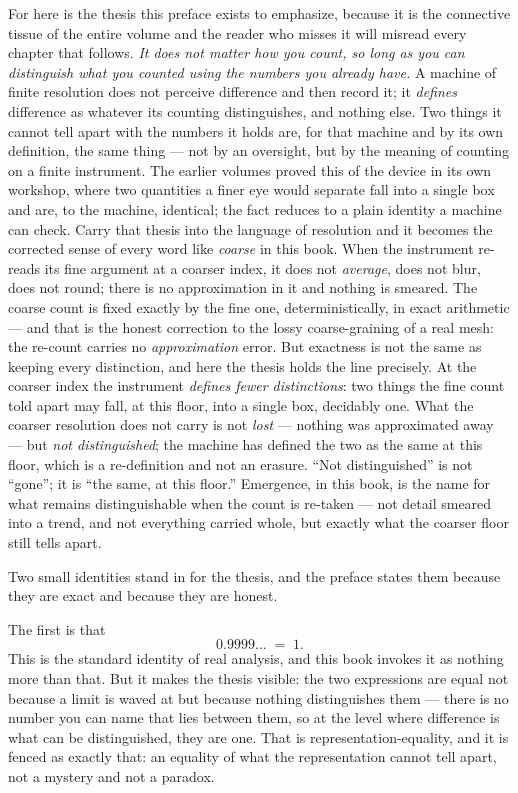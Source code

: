 For here is the thesis this preface exists to emphasize, because it is the
connective tissue of the entire volume and the reader who misses it will
misread every chapter that follows. \emph{It does not matter how you count, so
long as you can distinguish what you counted using the numbers you already
have.} A machine of finite resolution does not perceive difference and then
record it; it \emph{defines} difference as whatever its counting distinguishes,
and nothing else. Two things it cannot tell apart with the numbers it holds are,
for that machine and by its own definition, the same thing --- not by an
oversight, but by the meaning of counting on a finite instrument. The earlier
volumes proved this of the device in its own workshop, where two quantities a
finer eye would separate fall into a single box and are, to the machine,
identical; the fact reduces to a plain identity a machine can check. Carry that
thesis into the language of resolution and it becomes the corrected sense of
every word like \emph{coarse} in this book. When the instrument re-reads its
fine argument at a coarser index, it does not \emph{average}, does not blur,
does not round; there is no approximation in it and nothing is smeared. The
coarse count is fixed exactly by the fine one, deterministically, in exact
arithmetic --- and that is the honest correction to the lossy coarse-graining of
a real mesh: the re-count carries no \emph{approximation} error. But exactness is
not the same as keeping every distinction, and here the thesis holds the line
precisely. At the coarser index the instrument \emph{defines fewer
distinctions}: two things the fine count told apart may fall, at this floor, into
a single box, decidably one. What the coarser resolution does not carry is not
\emph{lost} --- nothing was approximated away --- but \emph{not distinguished};
the machine has defined the two as the same at this floor, which is a
re-definition and not an erasure. ``Not distinguished'' is not ``gone''; it is
``the same, at this floor.'' Emergence, in this book, is the name for what
remains distinguishable when the count is re-taken --- not detail smeared into a
trend, and not everything carried whole, but exactly what the coarser floor
still tells apart.

Two small identities stand in for the thesis, and the preface states them
because they are exact and because they are honest.

The first is that
\[
  0.9999\ldots \;=\; 1.
\]
This is the standard identity of real analysis, and this book invokes it as
nothing more than that. But it makes the thesis visible: the two expressions are
equal not because a limit is waved at but because nothing distinguishes them ---
there is no number you can name that lies between them, so at the level where
difference is what can be distinguished, they are one. That is
representation-equality, and it is fenced as exactly that: an equality of what
the representation cannot tell apart, not a mystery and not a paradox.

